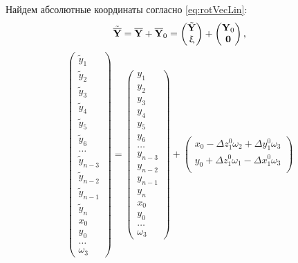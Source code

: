 Найдем абсолютные координаты согласно \eqref{eq:rotVecLin}:
\begin{equation}
	\tilde{\overline{\mathbf{Y}}} = \overline{\mathbf{Y}} + \overline{\mathbf{Y}}_0 =
	\begin{pmatrix} \tilde{\mathbf{Y}} \\ \upxi \end{pmatrix}
	+
	\begin{pmatrix} \mathbf{Y}_0 \\ \mathbf{0} \end{pmatrix}, \label{AbsoluteCoord}
\end{equation}
\begin{equation*}
	\begin{pmatrix}
		\tilde{y}_1 \\
		\tilde{y}_2 \\
		\tilde{y}_3 \\
		\tilde{y}_4 \\
		\tilde{y}_5 \\
		\tilde{y}_6 \\
		\hdots \\
		\tilde{y}_{n-3} \\
		\tilde{y}_{n-2} \\
		\tilde{y}_{n-1} \\
		\tilde{y}_{n} \\
		x_0 \\
		y_0 \\
		\hdots \\
		\omega_3
	\end{pmatrix} =
	\begin{pmatrix}
		y_1 \\
		y_2 \\
		y_3 \\
		y_4 \\
		y_5 \\
		y_6 \\
		\hdots \\
		y_{n-3} \\
		y_{n-2} \\
		y_{n-1} \\
		y_{n} \\
		x_0 \\
		y_0 \\
		\hdots \\
		\omega_3
	\end{pmatrix} +
	\begin{pmatrix}
		x_0 - \Delta z_1^0 \omega_2 + \Delta y_1^0 \omega_3 \\
		y_0 + \Delta z_1^0 \omega_1 - \Delta x_1^0 \omega_3 \\

\end{pmatrix}
\end{equation*}

